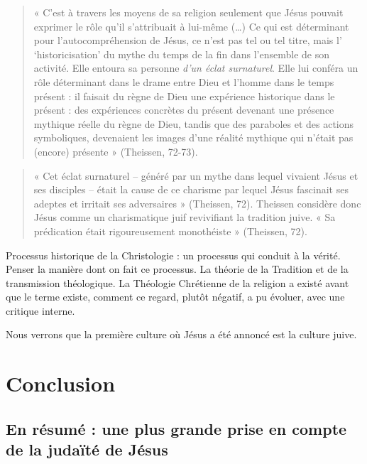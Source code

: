 \begin{quote}
   « C'est à travers les moyens de sa religion seulement que Jésus pouvait
exprimer le rôle qu'il s'attribuait à lui-même (\ldots) Ce qui est
déterminant pour l'autocompréhension de Jésus, ce n'est pas tel ou tel
titre, mais l' `historicisation' du mythe du temps de la fin dans
l'ensemble de son activité. Elle entoura sa personne \emph{d'un éclat
surnaturel}. Elle lui conféra un rôle déterminant dans le drame entre
Dieu et l'homme dans le temps présent : il faisait du règne de Dieu une
expérience historique dans le  présent : des expériences concrètes du présent devenant une présence
mythique réelle du règne de Dieu, tandis que des paraboles et des
actions symboliques, devenaient les images d'une réalité mythique qui
n'était pas (encore) présente » (Theissen, 72-73). 
\end{quote}

\begin{quote}
  « Cet éclat surnaturel -- généré par un mythe dans lequel vivaient Jésus
et ses disciples -- était la cause de ce charisme par lequel Jésus
fascinait ses adeptes et irritait ses adversaires » (Theissen, 72).
Theissen considère donc Jésus comme un charismatique juif revivifiant la
tradition juive. « Sa prédication était rigoureusement monothéiste »
(Theissen, 72).  
\end{quote}

 \begin{Synthesis}
Processus historique de la Christologie : un processus qui conduit à la vérité. Penser la manière dont on fait ce processus. La théorie de la Tradition et de la transmission théologique. 
La Théologie Chrétienne de la religion a existé avant que le terme existe, comment ce regard, plutôt négatif, a pu évoluer, avec une critique interne. 
\end{Synthesis}
Nous verrons que la première culture où Jésus a été annoncé est la culture juive.



 \section{Conclusion}
\subsection{En résumé : une plus grande prise en compte de la judaïté de Jésus}

